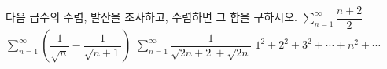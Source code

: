 다음 급수의 수렴, 발산을 조사하고, 수렴하면 그 합을 구하시오.
 $\displaystyle\sum_{n=1}^{\infty}\dfrac{n+2}{2}$
 $\displaystyle\sum_{n=1}^{\infty}\left(\dfrac{1}{\sqrt{n}}-\dfrac{1}{\sqrt{n+1}}\right)$
 $\displaystyle\sum_{n=1}^{\infty}\dfrac{1}{\sqrt{2n+2}+\sqrt{2n}}$
 $1^2+2^2+3^2+\cdots+n^2+\cdots$
